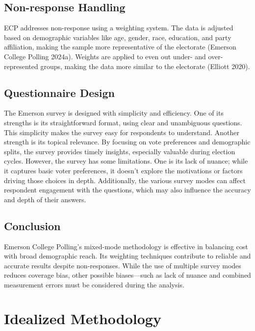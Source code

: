 \documentclass[
  letterpaper,
  DIV=11,
  numbers=noendperiod]{scrartcl}
\begin{document}
\hypertarget{non-response-handling}{%
\subsection{Non-response Handling}\label{non-response-handling}}

ECP addresses non-response using a weighting system. The data is
adjusted based on demographic variables like age, gender, race,
education, and party affiliation, making the sample more representative
of the electorate (Emerson College Polling 2024a). Weights are applied
to even out under- and over-represented groups, making the data more
similar to the electorate (Elliott 2020).

\hypertarget{questionnaire-design}{%
\subsection{Questionnaire Design}\label{questionnaire-design}}

The Emerson survey is designed with simplicity and efficiency. One of
its strengths is its straightforward format, using clear and unambiguous
questions. This simplicity makes the survey easy for respondents to
understand. Another strength is its topical relevance. By focusing on
vote preferences and demographic splits, the survey provides timely
insights, especially valuable during election cycles. However, the
survey has some limitations. One is its lack of nuance; while it
captures basic voter preferences, it doesn't explore the motivations or
factors driving those choices in depth. Additionally, the various survey
modes can affect respondent engagement with the questions, which may
also influence the accuracy and depth of their answers.

\hypertarget{conclusion}{%
\subsection{Conclusion}\label{conclusion}}

Emerson College Polling's mixed-mode methodology is effective in
balancing cost with broad demographic reach. Its weighting techniques
contribute to reliable and accurate results despite non-responses. While
the use of multiple survey modes reduces coverage bias, other possible
biases---such as lack of nuance and combined measurement errors must be
considered during the analysis.

\hypertarget{idealized-methodology}{%
\section{Idealized Methodology}\label{idealized-methodology}}
\end{document}
